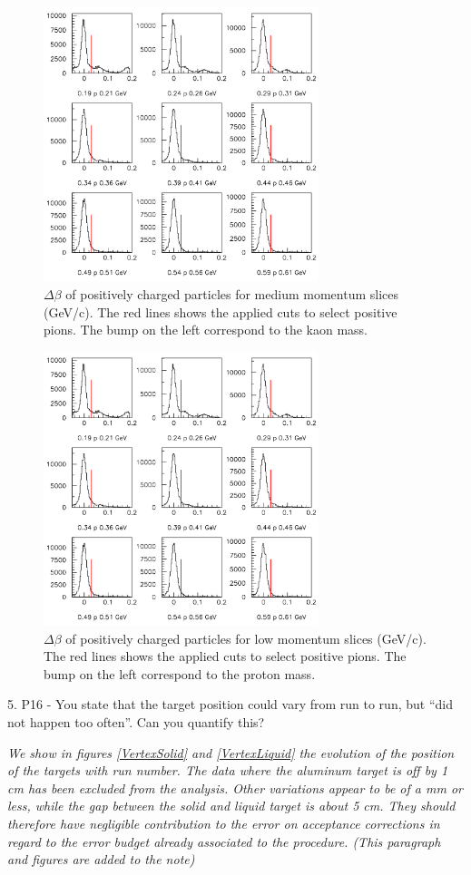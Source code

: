 \documentclass[12pt]{article}
\begin{document}
\begin{figure}[tbp]
\centering
\includegraphics[width=8cm] {answer-fig/TofProfile1.png} 
\caption {$\Delta \beta$ of positively charged particles for medium momentum slices 
(GeV/c). The red lines shows the applied cuts to select positive pions. The bump on the left
correspond to the kaon mass.}
\label{TOF-2}
\end{figure}

\begin{figure}[tbp]
\centering
\includegraphics[width=8cm] {answer-fig/TofProfile1.png} 
\caption {$\Delta \beta$ of positively charged particles for low momentum slices 
(GeV/c). The red lines shows the applied cuts to select positive pions. The bump on the left
correspond to the proton mass.}
\label{TOF-3}
\end{figure}

5.
P16 - You state that the target position could vary from run to run, but “did not happen too 
often”.  Can you quantify this?  

{\it We show in figures \ref{VertexSolid} and \ref{VertexLiquid} the evolution 
of the position of the targets with run number. The data where the aluminum
target is off by 1 cm has been excluded from the analysis. Other variations
appear to be of a mm or less, while the gap between the solid and liquid target
is about 5 cm. They should therefore have negligible contribution to the 
error on acceptance corrections in regard to the error budget already associated
to the procedure. (This paragraph and figures are added to the note)}\\
\end{document}
